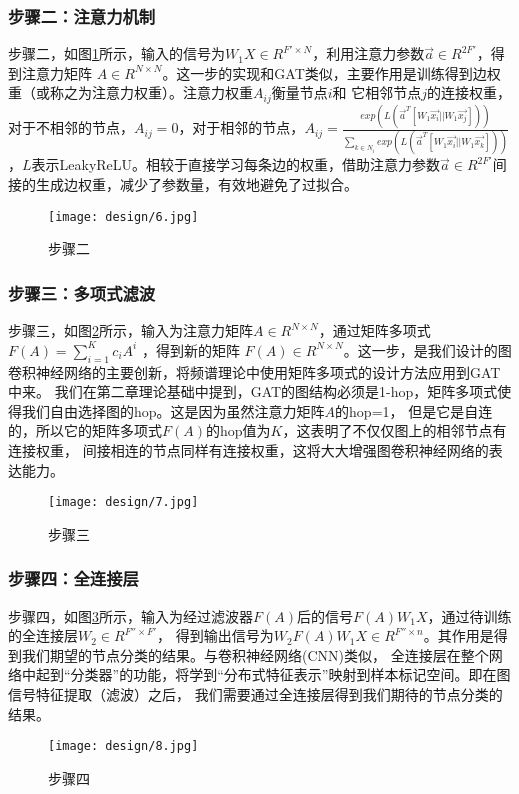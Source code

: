 \subsubsection{步骤二：注意力机制}
步骤二，如图\ref{3-6}所示，输入的信号为$ W_{1}X \in R^{F' \times N} $，利用注意力参数$ \vec{a} \in R^{2F'} $，得到注意力矩阵
$A \in R^{N \times N}$。这一步的实现和GAT类似，主要作用是训练得到边权重（或称之为注意力权重）。注意力权重$A_{ij}$衡量节点$i$和
它相邻节点$j$的连接权重，对于不相邻的节点，$A_{ij} = 0$，对于相邻的节点，$ A_{ij} = \frac{exp(L(\vec{a}^{T}[W_{1}\vec{x_{i}}||W_{1}\vec{x_{j}}]))} { {\textstyle \sum_{k\in N_{i} }^{}} exp(L(\vec{a}^{T}[W_{1}\vec{x_{i}}||W_{1}\vec{x_{k}}]))} $
，$L$表示LeakyReLU。相较于直接学习每条边的权重，借助注意力参数$ \vec{a} \in R^{2F'} $间接的生成边权重，减少了参数量，有效地避免了过拟合。
\begin{figure}[ht]
    \centering
    \texttt{[image: design/6.jpg]}
    \caption{\label{3-6}步骤二}
\end{figure}

\subsubsection{步骤三：多项式滤波}
步骤三，如图\ref{3-7}所示，输入为注意力矩阵$A \in R^{N \times N}$，通过矩阵多项式$ F(A)={\sum_{i=1}^{K}c_{i}A^{i}} $ ，得到新的矩阵
$F(A) \in R^{N \times N}$。这一步，是我们设计的图卷积神经网络的主要创新，将频谱理论中使用矩阵多项式的设计方法应用到GAT中来。
我们在第二章理论基础中提到，GAT的图结构必须是1-hop，矩阵多项式使得我们自由选择图的hop。这是因为虽然注意力矩阵$A$的hop=1，
但是它是自连的，所以它的矩阵多项式$ F(A) $的hop值为$K$，这表明了不仅仅图上的相邻节点有连接权重，
间接相连的节点同样有连接权重，这将大大增强图卷积神经网络的表达能力。
\begin{figure}[ht]
    \centering
    \texttt{[image: design/7.jpg]}
    \caption{\label{3-7}步骤三}
\end{figure}

\subsubsection{步骤四：全连接层}
步骤四，如图\ref{3-8}所示，输入为经过滤波器$ F(A) $后的信号$ F(A)W_{1}X $，通过待训练的全连接层$ W_2 \in R^{F'' \times F'} $，
得到输出信号为$ W_{2}F(A)W_{1}X \in R^{F'' \times n} $。其作用是得到我们期望的节点分类的结果。与卷积神经网络(CNN)类似，
全连接层在整个网络中起到“分类器”的功能，将学到“分布式特征表示”映射到样本标记空间。即在图信号特征提取（滤波）之后，
我们需要通过全连接层得到我们期待的节点分类的结果。
\begin{figure}[ht]
    \centering
    \texttt{[image: design/8.jpg]}
    \caption{\label{3-8}步骤四}
\end{figure}

